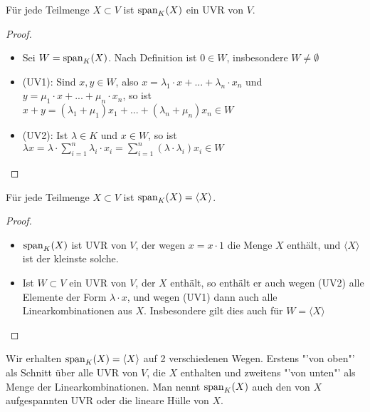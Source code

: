 \begin{lemma}
	Für jede Teilmenge $X \subset V$ ist $\operatorname{span}_K(X)$ ein UVR von $V$.
\end{lemma}
\begin{proof}
	\begin{itemize}
		\item Sei $W=\operatorname{span}_K(X)$. Nach Definition ist $0 \in W$, insbesondere $W\neq\emptyset$
		\item (UV1): Sind $x,y \in W$, also $x=\lambda_1\cdot x+...+\lambda_n\cdot x_n$ und $y=\mu_1\cdot x+...+
		\mu_n\cdot x_n$, so ist $x+y=(\lambda_1+\mu_1)x_1+...+(\lambda_n+\mu_n)x_n \in W$
		\item (UV2): Ist $\lambda \in K$ und $x \in W$, so ist $\lambda x=\lambda\cdot\sum_{i=1}^n \lambda_i\cdot x_i=
		\sum_{i=1}^n (\lambda\cdot\lambda_i)x_i \in W$
	\end{itemize}
\end{proof}

\begin{proposition}
	Für jede Teilmenge $X \subset V$ ist $\operatorname{span}_K(X)=\langle X\rangle$.
\end{proposition}
\begin{proof}
	\begin{itemize}
		\item $\operatorname{span}_K(X)$ ist UVR von $V$, der wegen $x=x\cdot 1$ die Menge $X$ enthält, und $\langle X\rangle$ ist der kleinste solche.
		\item Ist $W\subset V$ ein UVR von $V$, der $X$ enthält, so enthält er auch wegen (UV2) alle Elemente der Form 
		$\lambda\cdot x$, und wegen (UV1) dann auch alle Linearkombinationen aus $X$. Insbesondere gilt dies auch für $W=\langle X\rangle$
	\end{itemize}
\end{proof}

\begin{remark}
	Wir erhalten $\operatorname{span}_K(X)=\langle X\rangle$ auf 2 verschiedenen Wegen. Erstens "'von oben"' als Schnitt über alle UVR 
	von $V$, die $X$ enthalten und zweitens "'von unten"' als Menge der Linearkombinationen. Man nennt $\operatorname{span}_K(X)$ auch den 
	von $X$ aufgespannten UVR oder die lineare Hülle von $X$.
\end{remark}

